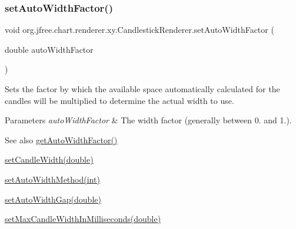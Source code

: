\mbox{\label{classorg_1_1jfree_1_1chart_1_1renderer_1_1xy_1_1_candlestick_renderer_a0189cacb382b9e002ad932e555a79664}} 
\subsubsection{\texorpdfstring{set\+Auto\+Width\+Factor()}{setAutoWidthFactor()}}
{\footnotesize\ttfamily void org.\+jfree.\+chart.\+renderer.\+xy.\+Candlestick\+Renderer.\+set\+Auto\+Width\+Factor (\begin{DoxyParamCaption}\item[{double}]{auto\+Width\+Factor }\end{DoxyParamCaption})}

Sets the factor by which the available space automatically calculated for the candles will be multiplied to determine the actual width to use.


\begin{DoxyParams}{Parameters}
{\em auto\+Width\+Factor} & The width factor (generally between 0. and 1.).\\
\hline
\end{DoxyParams}
\begin{DoxySeeAlso}{See also}
\mbox{\hyperlink{classorg_1_1jfree_1_1chart_1_1renderer_1_1xy_1_1_candlestick_renderer_ac7b617c9739390cf4e97dfb42d0845d0}{get\+Auto\+Width\+Factor()}} 

\mbox{\hyperlink{classorg_1_1jfree_1_1chart_1_1renderer_1_1xy_1_1_candlestick_renderer_a212b98d88bbc173df25fcafd7f983ff3}{set\+Candle\+Width(double)}} 

\mbox{\hyperlink{classorg_1_1jfree_1_1chart_1_1renderer_1_1xy_1_1_candlestick_renderer_a556f4cc791dcf82be3e4e82c6f82dd66}{set\+Auto\+Width\+Method(int)}} 

\mbox{\hyperlink{classorg_1_1jfree_1_1chart_1_1renderer_1_1xy_1_1_candlestick_renderer_ae86e0bc0453129bf8579ae7a5d2ee821}{set\+Auto\+Width\+Gap(double)}} 

\mbox{\hyperlink{classorg_1_1jfree_1_1chart_1_1renderer_1_1xy_1_1_candlestick_renderer_a7f28bced2a25bf012d05127ac175af49}{set\+Max\+Candle\+Width\+In\+Milliseconds(double)}} 
\end{DoxySeeAlso}
\mbox{\label{classorg_1_1jfree_1_1chart_1_1renderer_1_1xy_1_1_candlestick_renderer_ae86e0bc0453129bf8579ae7a5d2ee821}} 
